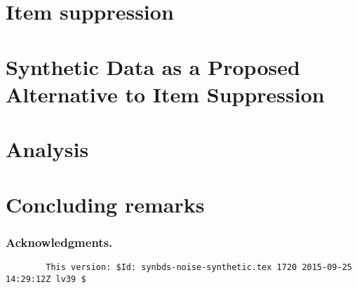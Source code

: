 \documentclass[runningheads,a4paper,11pt]{llncs}
\begin{document}
\section{Item suppression}
\label{sec:item_suppression}



\section{Synthetic Data as a Proposed Alternative to Item Suppression}
\label{sec:synthetic_method}


\section{Analysis}
\label{sec:analysis}


\section{Concluding remarks}
\label{sec:conclusion}


\subsubsection*{Acknowledgments.} 
\label{sec:ack}


\clearpage





\clearpage
{\tiny
\begin{verbatim}
        This version: $Id: synbds-noise-synthetic.tex 1720 2015-09-25 14:29:12Z lv39 $
\end{verbatim}
}
\end{document}
